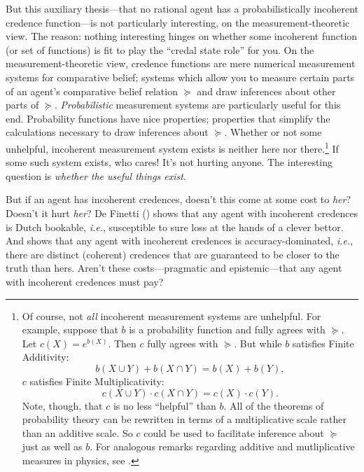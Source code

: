 But this auxiliary thesis---that no rational agent has a probabilistically incoherent credence function---is not particularly interesting, on the measurement-theoretic view. The reason: nothing interesting hinges on whether some incoherent function (or set of functions) is fit to play the ``credal state role'' for you. On the measurement-theoretic view, credence functions are mere numerical measurement systems for comparative belief; systems which allow you to measure certain parts of an agent's comparative belief relation $\succeq$ and draw inferences about other parts of $\succeq$. \textit{Probabilistic} measurement systems are particularly useful for this end. Probability functions have nice properties; properties that simplify the calculations necessary to draw inferences about $\succeq$. Whether or not some unhelpful, incoherent measurement system exists is neither here nor there.\footnote{Of course, not \textit{all} incoherent measurement systems are unhelpful. For example, suppose that $b$ is a probability function and fully agrees with $\succeq$. Let $c(X)=e^{b(X)}$. Then $c$ fully agrees with $\succeq$. But while $b$ satisfies Finite Additivity:
$$b(X\cup Y)+b(X\cap Y)=b(X)+b(Y),$$
$c$ satisfies Finite Multiplicativity:
$$ c(X\cup Y)\cdot c(X\cap Y)=c(X)\cdot c(Y).$$
Note, though, that $c$ is no less ``helpful'' than $b$. All of the theorems of probability theory can be rewritten in terms of a multiplicative scale rather than an additive scale. So $c$ could be used to facilitate inference about $\succeq$ just as well as $b$. For analogous remarks regarding additive and mutliplicative measures in physics, see \citep[p. 100]{Krantz1971}.} If some such system exists, who cares! It's not hurting anyone. The interesting question is \textit{whether the useful things exist}.

But if an agent has incoherent credences, doesn't this come at some cost to \textit{her}? Doesn't it hurt \textit{her}? De Finetti () shows that any agent with incoherent credences is Dutch bookable, \textit{i.e.}, susceptible to sure loss at the hands of a clever bettor. And \citet{Joyce1998, Joyce2009} shows that any agent with incoherent credences is accuracy-dominated, \textit{i.e.}, there are distinct (coherent) credences that are guaranteed to be closer to the truth than hers. Aren't these costs---pragmatic and epistemic---that any agent with incoherent credences must pay?

